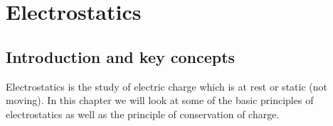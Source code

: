          \chapter{Electrostatics}
    \label{464e844ca5615087ea89d9d95dd9a43a}
         \section{Introduction and key concepts}
    \nopagebreak
    \label{m38780*cid2}
       
      \label{m38780*id200254}Electrostatics is the study of electric charge which is at rest or static (not moving). In this chapter we will look at some of the basic principles of electrostatics as well as the principle of conservation of charge. \par 
{}
    \label{m38780*cid3}

